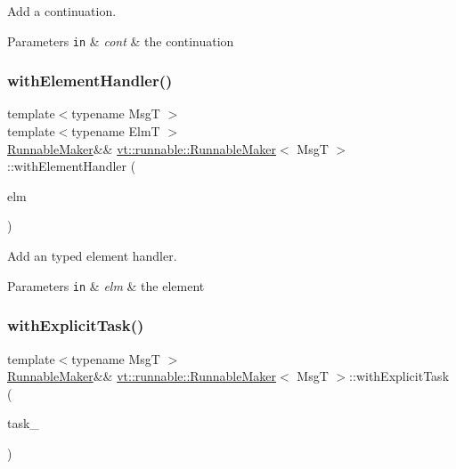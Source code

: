 Add a continuation. 


\begin{DoxyParams}[1]{Parameters}
\mbox{\tt in}  & {\em cont} & the continuation \\
\hline
\end{DoxyParams}
\mbox{\label{structvt_1_1runnable_1_1_runnable_maker_a1b37afe7a5ab185c29e85e0d6ebbbc82}} 
\subsubsection{\texorpdfstring{with\+Element\+Handler()}{withElementHandler()}}
{\footnotesize\ttfamily template$<$typename MsgT $>$ \\
template$<$typename ElmT $>$ \\
\hyperlink{structvt_1_1runnable_1_1_runnable_maker}{Runnable\+Maker}\&\& \hyperlink{structvt_1_1runnable_1_1_runnable_maker}{vt\+::runnable\+::\+Runnable\+Maker}$<$ MsgT $>$\+::with\+Element\+Handler (\begin{DoxyParamCaption}\item[{ElmT $\ast$}]{elm }\end{DoxyParamCaption})\hspace{0.3cm}{\ttfamily [inline]}}



Add an typed element handler. 


\begin{DoxyParams}[1]{Parameters}
\mbox{\tt in}  & {\em elm} & the element \\
\hline
\end{DoxyParams}
\mbox{\label{structvt_1_1runnable_1_1_runnable_maker_abe4aca5620c53dc9e035c3a60fe8c76b}} 
\subsubsection{\texorpdfstring{with\+Explicit\+Task()}{withExplicitTask()}}
{\footnotesize\ttfamily template$<$typename MsgT $>$ \\
\hyperlink{structvt_1_1runnable_1_1_runnable_maker}{Runnable\+Maker}\&\& \hyperlink{structvt_1_1runnable_1_1_runnable_maker}{vt\+::runnable\+::\+Runnable\+Maker}$<$ MsgT $>$\+::with\+Explicit\+Task (\begin{DoxyParamCaption}\item[{\hyperlink{namespacevt_ae0a5a7b18cc99d7b732cb4d44f46b0f3}{Action\+Type}}]{task\+\_\+ }\end{DoxyParamCaption})\hspace{0.3cm}{\ttfamily [inline]}}



